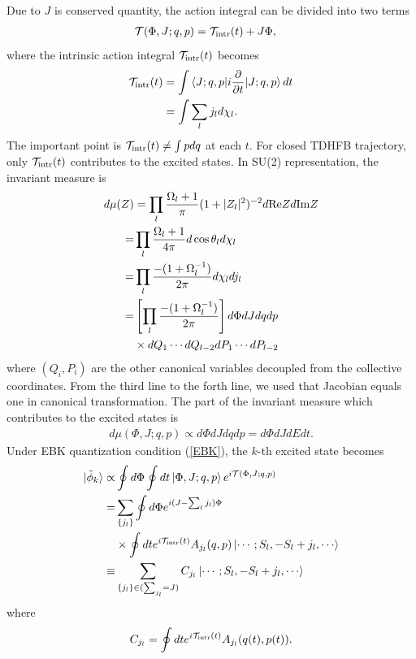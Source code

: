 \documentclass[%
superscriptaddress,
showpacs,
nofootinbib,
amsmath,amssymb,
aps,
prc,
twocolumn,
floatfix ]%
{revtex4-1}
\begin{document}
Due to $J$ is conserved quantity, the action integral can be divided into two terms
\begin{align}
  \mathcal{T}(\Phi,J;q,p) &= \mathcal{T}_{\rm intr}(t) + J\Phi, 
\end{align}
where the intrinsic action integral $\mathcal{T}_{\rm intr}(t)$ becomes
\begin{align}
  \mathcal{T}_{\rm intr}(t) &= \int \braket{J;q,p|i\frac{\partial}{\partial t}|J;q,p} dt
	 \nonumber \\
	&= \int \sum_l j_l d\chi_l .
	\label{tau}
\end{align}
The important point is $\mathcal{T}_{\rm intr}(t) \ne \int p dq$ at each $t$. For closed TDHFB trajectory, only $\mathcal{T}_{\rm intr}(t)$ contributes to the excited states.
In SU(2) representation, the invariant measure is
\begin{align}
  d\mu(Z) &= \prod_l \frac{\Omega_l+1}{\pi} (1+|Z_l|^2)^{-2} d{\rm Re}Z d{\rm Im}Z \nonumber \\
 =& \prod_l \frac{\Omega_l+1}{4\pi} d \cos{\theta_l} d\chi_l \nonumber \\
 =& \prod_l \frac{-(1+\Omega_l^{-1})}{2\pi} d\chi_l dj_l \nonumber \\
 =& \left[ \prod_l \frac{-(1+\Omega_l^{-1})}{2\pi} \right] d\Phi dJ dqdp \nonumber \\
 &\times dQ_1\cdots dQ_{l-2}dP_1\cdots dP_{l-2}
\end{align}
where $(Q_i,P_i)$ are the other canonical variables decoupled from the collective coordinates. From the third line to the forth line, we used that Jacobian equals one in canonical transformation. The part of the invariant measure which contributes to the excited states is
\begin{align}
d\mu(\Phi,J;q,p) \propto d\Phi dJ dqdp = d\Phi dJ dE dt. 
\end{align}
Under EBK quantization condition (\ref{EBK}),
the $k$-th excited state becomes
\begin{align}
 \ket{\tilde{\phi}_k} \propto& \oint d\Phi \oint dt \ket{\Phi,J;q,p} e^{i\mathcal{T}(\Phi,J;q,p)}
 \nonumber \\
 =& \sum_{\{j_l\}} \oint d\Phi e^{i(J-\sum_l j_l)\Phi} \nonumber \\
 &\times \oint dt e^{i\mathcal{T}_{\rm intr}(t)} A_{j_l}(q,p) \ket{\cdots;S_l,-S_l+j_l,\cdots} \nonumber \\
 \equiv& \sum_{\{j_l\}\in (\sum_{j_l}=J)} C_{j_l} \ket{\cdots;S_l,-S_l+j_l,\cdots}
\end{align}
where
\begin{align}
  C_{j_l} = \oint dt e^{i\mathcal{T}_{\rm intr}(t)} A_{j_l}(q(t),p(t)).
  \label{coef}
\end{align}
\end{document}
